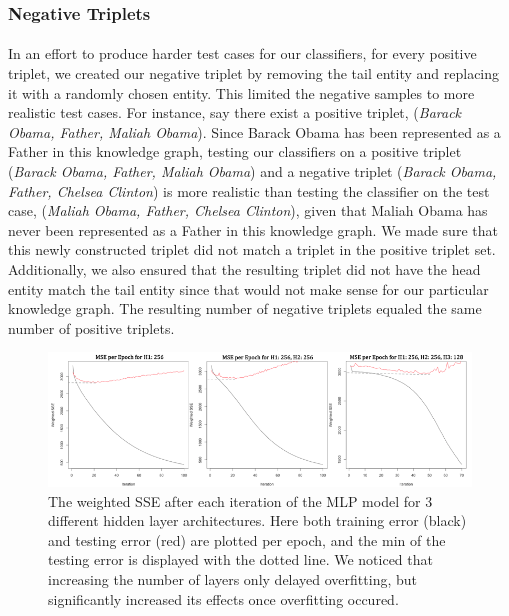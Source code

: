 \documentclass[11.5pt]{article}
\newcounter{graphics}
\begin{document}
\subsubsection{Negative Triplets} 
\paragraph{} In an effort to produce harder test cases for our classifiers, for every positive triplet, we created our negative triplet by removing the tail  entity and replacing it with a randomly chosen entity. This limited the negative samples to more realistic test cases. For instance, say there exist a positive triplet, (\textit{Barack Obama, Father, Maliah Obama}). Since Barack Obama has been represented as a Father in this knowledge graph, testing our classifiers on a positive triplet (\textit{Barack Obama, Father, Maliah Obama}) and a negative triplet (\textit{Barack Obama, Father, Chelsea Clinton}) is more realistic than testing the classifier on the test case, (\textit{Maliah Obama, Father, Chelsea Clinton}), given that Maliah Obama has never been represented as a Father in this knowledge graph.  We made sure that this newly constructed triplet did not match a triplet in the positive triplet set. Additionally, we also ensured that the resulting triplet did not have the head entity match the tail entity since that would not make sense for our particular knowledge graph. The resulting number of negative triplets equaled the same number of positive triplets.



\begin{figure}[h!]
\centerline{\includegraphics[width=1\textwidth]{report_mlp/MSEperEpochMLP.png}}
  \caption{\small  The weighted SSE after each iteration of the MLP model for 3 different hidden layer architectures. Here both training error (black) and testing error (red) are plotted per epoch, and the min of the testing error is displayed with the dotted line. We noticed that increasing the number of layers only delayed overfitting, but significantly increased its effects once overfitting occured.  }
\label{MSEperEpochMLP}
\end{figure}
\end{document}
